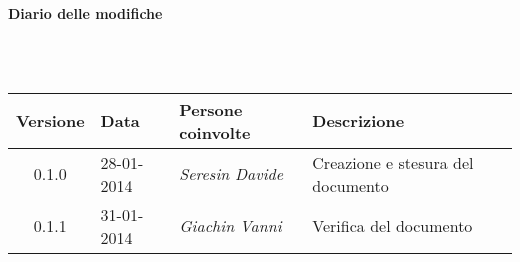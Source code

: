 \begin{Large}\textbf{Diario delle modifiche}\end{Large}\\
\\
\begin{small}
\begin{tabular}{|c|p{1.7cm}|p{2.8cm}|p{7cm}|}
\hline
Versione & Data & Persone coinvolte & Descrizione \\
\hline
\hline
0.1.0 & 28-01-2014 & \textit{Seresin Davide} &  Creazione e stesura del documento\\
\hline
\hline
0.1.1 & 31-01-2014 & \textit{Giachin Vanni} &  Verifica del documento\\
\hline
\end{tabular}\\
\end{small}
